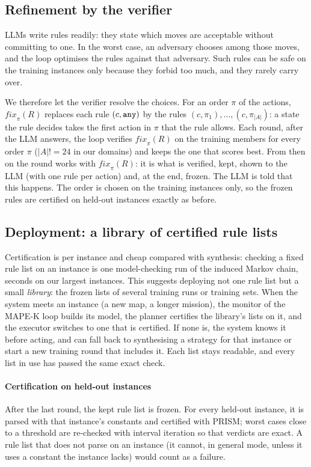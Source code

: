 \subsection{Refinement by the verifier}\label{sec:approach-refine}
LLMs write \any{} rules readily: they state which moves are acceptable without committing to one. In the worst case,
an adversary chooses among those moves, and the loop optimises the rules against that adversary. Such rules can be
safe on the training instances only because they forbid too much, and they rarely carry over.

We therefore let the verifier resolve the choices. For an order $\pi$ of the actions, $\mathit{fix}_\pi(R)$ replaces
each rule $(c, \texttt{any})$ by the rules $(c, \pi_1), \dots, (c, \pi_{|A|})$: a state the rule decides takes the first
action in $\pi$ that the rule allows. Each round, after the LLM answers, the loop verifies $\mathit{fix}_\pi(R)$ on
the training members for every order $\pi$ ($|A|! = 24$ in our domains) and keeps the one that scores best. From then
on the round works with $\mathit{fix}_\pi(R)$: it is what is verified, kept, shown to the LLM (with one rule per
action) and, at the end, frozen. The LLM is told that this happens. The order is chosen on the training instances
only, so the frozen rules are certified on held-out instances exactly as before.

\subsection{Deployment: a library of certified rule lists}\label{sec:approach-library}
Certification is per instance and cheap compared with synthesis: checking a fixed rule list on an instance is one
model-checking run of the induced Markov chain, seconds on our largest instances. This suggests deploying not one rule
list but a small \emph{library}: the frozen lists of several training runs or training sets. When the system meets an
instance (a new map, a longer mission), the monitor of the MAPE-K loop builds its model, the planner certifies the
library's lists on it, and the executor switches to one that is certified. If none is, the system knows it before
acting, and can fall back to synthesising a strategy for that instance or start a new training round that includes
it. Each list stays readable, and every list in use has passed the same exact check.

\paragraph*{Certification on held-out instances}
After the last round, the kept rule list is frozen. For every held-out instance, it is parsed with that instance's
constants and certified with PRISM; worst cases close to a threshold are re-checked with interval iteration so that
verdicts are exact. A rule list that does not parse on an instance (it cannot, in general mode, unless it uses a
constant the instance lacks) would count as a failure.
